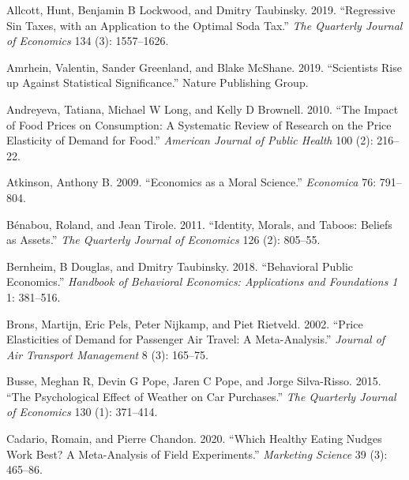 \documentclass[
]{book}
\newlength{\cslhangindent}
\newlength{\cslentryspacingunit} %
\newenvironment{CSLReferences}[2] %
 {%
  \setlength{\parindent}{0pt}
  \ifodd #1
  \let\oldpar\par
  \def\par{\hangindent=\cslhangindent\oldpar}
  \fi
  \setlength{\parskip}{#2\cslentryspacingunit}
 }%
 {}
\begin{document}
\hypertarget{refs}{}
\begin{CSLReferences}{1}{0}
\leavevmode{}%
Allcott, Hunt, Benjamin B Lockwood, and Dmitry Taubinsky. 2019. {``Regressive Sin Taxes, with an Application to the Optimal Soda Tax.''} \emph{The Quarterly Journal of Economics} 134 (3): 1557--1626.

\leavevmode{}%
Amrhein, Valentin, Sander Greenland, and Blake McShane. 2019. {``Scientists Rise up Against Statistical Significance.''} Nature Publishing Group.

\leavevmode{}%
Andreyeva, Tatiana, Michael W Long, and Kelly D Brownell. 2010. {``The Impact of Food Prices on Consumption: A Systematic Review of Research on the Price Elasticity of Demand for Food.''} \emph{American Journal of Public Health} 100 (2): 216--22.

\leavevmode{}%
Atkinson, Anthony B. 2009. {``Economics as a Moral Science.''} \emph{Economica} 76: 791--804.

\leavevmode{}%
Bénabou, Roland, and Jean Tirole. 2011. {``Identity, Morals, and Taboos: Beliefs as Assets.''} \emph{The Quarterly Journal of Economics} 126 (2): 805--55.

\leavevmode{}%
Bernheim, B Douglas, and Dmitry Taubinsky. 2018. {``Behavioral Public Economics.''} \emph{Handbook of Behavioral Economics: Applications and Foundations 1} 1: 381--516.

\leavevmode{}%
Brons, Martijn, Eric Pels, Peter Nijkamp, and Piet Rietveld. 2002. {``Price Elasticities of Demand for Passenger Air Travel: A Meta-Analysis.''} \emph{Journal of Air Transport Management} 8 (3): 165--75.

\leavevmode{}%
Busse, Meghan R, Devin G Pope, Jaren C Pope, and Jorge Silva-Risso. 2015. {``The Psychological Effect of Weather on Car Purchases.''} \emph{The Quarterly Journal of Economics} 130 (1): 371--414.

\leavevmode{}%
Cadario, Romain, and Pierre Chandon. 2020. {``Which Healthy Eating Nudges Work Best? A Meta-Analysis of Field Experiments.''} \emph{Marketing Science} 39 (3): 465--86.


\end{CSLReferences}
\end{document}
